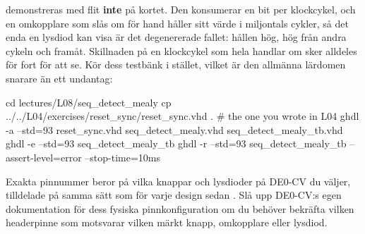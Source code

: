  demonstreras med flit \textbf{inte} på kortet. Den konsumerar en bit per
klockcykel, och en omkopplare som slås om för hand håller sitt värde i miljontals cykler, så det
enda en lysdiod kan visa är det degenererade fallet:  hållen hög,  hög från andra
cykeln och framåt. Skillnaden på en klockcykel som hela  handlar om sker
alldeles för fort för att se. Kör dess testbänk i stället, vilket är den allmänna lärdomen snarare
än ett undantag:

\begin{shell}
cd lectures/L08/seq_detect_mealy
cp ../../L04/exercises/reset_sync/reset_sync.vhd .     # the one you wrote in L04
ghdl -a --std=93 reset_sync.vhd seq_detect_mealy.vhd seq_detect_mealy_tb.vhd
ghdl -e --std=93 seq_detect_mealy_tb
ghdl -r --std=93 seq_detect_mealy_tb --assert-level=error --stop-time=10ms
\end{shell}

Exakta pinnummer beror på vilka knappar och lysdioder på DE0-CV du väljer, tilldelade på samma sätt
som för varje design sedan . Slå upp DE0-CV:s egen dokumentation för dess fysiska
pinnkonfiguration om du behöver bekräfta vilken headerpinne som motsvarar vilken märkt knapp,
omkopplare eller lysdiod.
